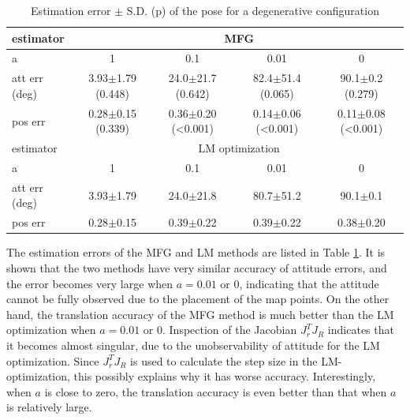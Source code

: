 \begin{table}
	\centering
	\caption{Estimation error $\pm$ S.D. (p) of the pose for a degenerative configuration}
	\label{tab:VIO-pose-error2}
	\footnotesize
	\begin{tabular}{l|cccc}
		\hline\hline
		estimator & \multicolumn{4}{c}{MFG} \\ \hline
		a & 1 & 0.1 & 0.01 & 0 \\ \hline
		att err (deg) & 3.93$\pm$1.79 (0.448) & 24.0$\pm$21.7 (0.642) & 82.4$\pm$51.4 (0.065) & 90.1$\pm$0.2 (0.279) \\
		pos err & 0.28$\pm$0.15 (0.339) & 0.36$\pm$0.20 (<0.001) & 0.14$\pm$0.06 (<0.001) & 0.11$\pm$0.08 (<0.001) \\
		\midrule[1.2pt]
		estimator & \multicolumn{4}{c}{LM optimization} \\ \hline
		a & 1 & 0.1 & 0.01 & 0 \\ \hline
		att err (deg) & 3.93$\pm$1.79 & 24.0$\pm$21.8 & 80.7$\pm$51.2 & 90.1$\pm$0.1 \\
		pos err & 0.28$\pm$0.15 & 0.39$\pm$0.22 & 0.39$\pm$0.22 & 0.38$\pm$0.20 \\
		\hline\hline
	\end{tabular}
\end{table}

The estimation errors of the MFG and LM methods are listed in Table \ref{tab:VIO-pose-error2}.
It is shown that the two methods have very similar accuracy of attitude errors, and the error becomes very large when $a = 0.01$ or 0, indicating that the attitude cannot be fully observed due to the placement of the map points.
On the other hand, the translation accuracy of the MFG method is much better than the LM optimization when $a = 0.01$ or 0.
Inspection of the Jacobian $J_r^TJ_R$ indicates that it becomes almost singular, due to the unobservability of attitude for the LM optimization.
Since $J_r^TJ_R$ is used to calculate the step size in the LM-optimization, this possibly explains why it has worse accuracy.
Interestingly, when $a$ is close to zero, the translation accuracy is even better than that when $a$ is relatively large.

